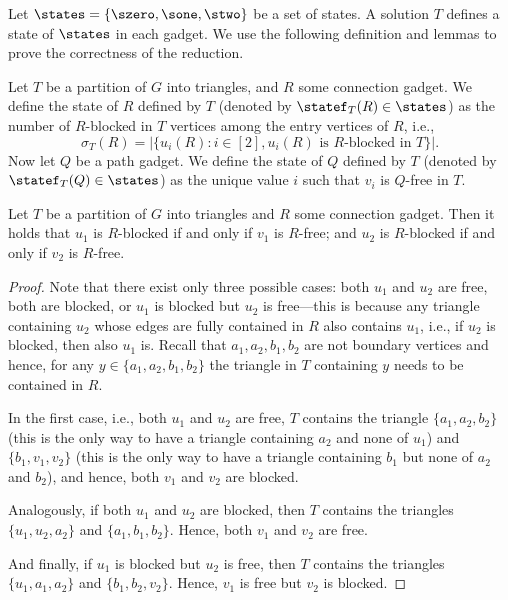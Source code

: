 \documentclass[a4paper,UKenglish,cleveref, autoref, thm-restate]{lipics-v2021}
\begin{document}
Let $\states=\{\szero, \sone, \stwo\}$ be a set of states. A solution $T$ defines a state of $\states$ in each gadget. We use the following definition and lemmas to prove the correctness of the reduction.


\begin{definition}
    Let $T$ be a partition of $G$ into triangles, and $R$ some connection gadget. We define the state of $R$ defined by $T$ (denoted by $\statef_T(R) \in \states$) as the number of $R$-blocked in $T$ vertices among the entry vertices of $R$, i.e.,
    \[
        \sigma_T(R) = |\{u_i(R) \colon i \in [2], u_i(R) \text{ is $R$-blocked in $T$}\}|.
    \]
    Now let $Q$ be a path gadget. We define the state of $Q$ defined by $T$ (denoted by $\statef_T(Q)\in\states$) as the unique value $i$ such that $v_i$ is $Q$-free in $T$.
\end{definition}

\begin{lemma}\label{tripack-lb::lem:state-connection-gadget}
    Let $T$ be a partition of $G$ into triangles and $R$ some connection gadget. Then it holds that $u_1$ is $R$-blocked if and only if $v_1$ is $R$-free; and $u_2$ is $R$-blocked if and only if $v_2$ is $R$-free.
\end{lemma}

\begin{proof}
    Note that there exist only three possible cases: both $u_1$ and $u_2$ are free, both are blocked, or $u_1$ is blocked but $u_2$ is free---this is because any triangle containing $u_2$ whose edges are fully contained in $R$ also contains $u_1$, i.e., if $u_2$ is blocked, then also $u_1$ is. 
    Recall that $a_1, a_2, b_1, b_2$ are not boundary vertices and hence, for any $y \in \{a_1, a_2, b_1, b_2\}$ the triangle in $T$ containing $y$ needs to be contained in $R$.
    
    In the first case, i.e., both $u_1$ and $u_2$ are free, $T$ contains the triangle $\{a_1, a_2, b_2\}$ (this is the only way to have a triangle containing $a_2$ and none of $u_1$) and $\{b_1, v_1, v_2\}$ (this is the only way to have a triangle containing $b_1$ but none of $a_2$ and $b_2$), and hence, both $v_1$ and $v_2$ are blocked. 
    
    Analogously, if both $u_1$ and $u_2$ are blocked, then $T$ contains the triangles $\{u_1, u_2, a_2\}$ and $\{a_1, b_1, b_2\}$. Hence, both $v_1$ and $v_2$ are free. 
    
    And finally, if $u_1$ is blocked but $u_2$ is free, then $T$ contains the triangles $\{u_1, a_1, a_2\}$ and $\{b_1, b_2, v_2\}$. Hence, $v_1$ is free but $v_2$ is blocked.
\end{proof}
\end{document}
